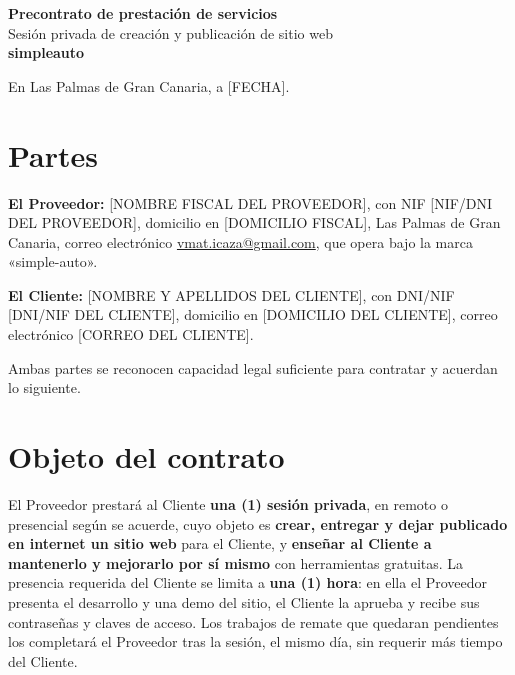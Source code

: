 \documentclass[11pt,a4paper]{article}
\makeatletter
\newcommand{\provNombre}{[NOMBRE FISCAL DEL PROVEEDOR]}
\newcommand{\provNif}{[NIF/DNI DEL PROVEEDOR]}
\newcommand{\provDomicilio}{[DOMICILIO FISCAL], Las Palmas de Gran Canaria}
\newcommand{\provEmail}{vmat.icaza@gmail.com}
\newcommand{\provMarca}{simple-auto}
\newcommand{\cliNombre}{[NOMBRE Y APELLIDOS DEL CLIENTE]}
\newcommand{\cliNif}{[DNI/NIF DEL CLIENTE]}
\newcommand{\cliDomicilio}{[DOMICILIO DEL CLIENTE]}
\newcommand{\cliEmail}{[CORREO DEL CLIENTE]}
\newcommand{\fechaContrato}{[FECHA]}            %
\makeatother
\begin{document}
\begin{center}
  {\LARGE\bfseries Precontrato de prestación de servicios}\\[2pt]
  {\large Sesión privada de creación y publicación de sitio web}\\[6pt]
  {\small\color{accent}\textbf{simple}\color{black}\textbf{auto}}
\end{center}

\vspace{0.6em}
\noindent En Las Palmas de Gran Canaria, a \fechaContrato.

\section{Partes}

\noindent\textbf{El Proveedor:} \provNombre, con NIF \provNif, domicilio en
\provDomicilio, correo electrónico \href{mailto:\provEmail}{\provEmail}, que opera
bajo la marca «\provMarca».

\smallskip
\noindent\textbf{El Cliente:} \cliNombre, con DNI/NIF \cliNif, domicilio en
\cliDomicilio, correo electrónico \cliEmail.

\smallskip
\noindent Ambas partes se reconocen capacidad legal suficiente para contratar y
acuerdan lo siguiente.

\section{Objeto del contrato}

El Proveedor prestará al Cliente \textbf{una (1) sesión privada}, en remoto
o presencial según se acuerde, cuyo objeto es \textbf{crear, entregar y dejar
publicado en internet un sitio web} para el Cliente, y \textbf{enseñar al Cliente a
mantenerlo y mejorarlo por sí mismo} con herramientas gratuitas. La presencia
requerida del Cliente se limita a \textbf{una (1) hora}: en ella el Proveedor
presenta el desarrollo y una demo del sitio, el Cliente la aprueba y recibe sus
contraseñas y claves de acceso. Los trabajos de remate que quedaran pendientes los
completará el Proveedor tras la sesión, el mismo día, sin requerir más tiempo del
Cliente.

\end{document}
